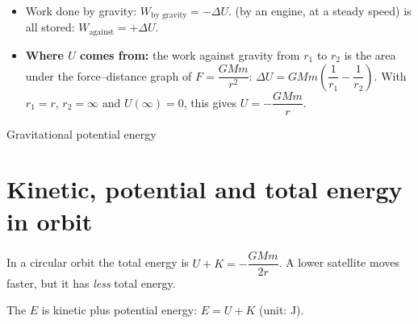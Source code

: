 \begin{itemize}
  \item Work done by gravity: $W_\text{by gravity} = -\Delta U$.  (by an engine, at a steady speed) is all stored:
        $W_\text{against} = +\Delta U$.
  \item \textbf{Where $U$ comes from:} the work against gravity from $r_1$ to
        $r_2$ is the area under the force--distance graph of
        $F = \dfrac{GMm}{r^2}$:
        $\Delta U = GMm\left(\dfrac{1}{r_1} - \dfrac{1}{r_2}\right)$. With
        $r_1 = r$, $r_2 = \infty$ and $U(\infty) = 0$, this gives
        $U = -\dfrac{GMm}{r}$.
\end{itemize}

\begin{formulacard}{Gravitational potential energy}
  \begin{symbols}
  \end{symbols}
\end{formulacard}

\section{Kinetic, potential and total energy in orbit}\label{ch5:sec:orbit}

\begin{bigidea}
In a circular orbit the total energy is $U + K = -\dfrac{GMm}{2r}$. A lower
satellite moves faster, but it has \emph{less} total energy.
\end{bigidea}

The  $E$ is kinetic plus potential energy:
$E = U + K$ (unit: J).

